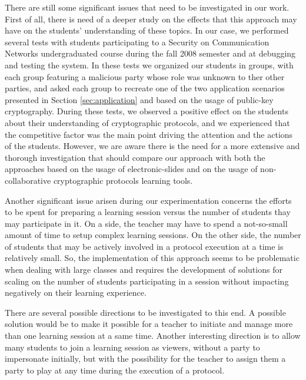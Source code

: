 \documentclass[conference]{IEEEtran}
\begin{document}
There are still some significant issues that need to be
investigated in our work. First of all, there is need of a deeper study on
the effects that this approach may have on
the students' understanding of these topics. In our case, we performed
several tests with students participating to a Security on
Communication Networks undergraduated course during the fall 2008
semester and at debugging and testing the system. In these tests we
organized our students in groups, with each group featuring a
malicious party whose role was unknown to ther other parties, and
asked each group to recreate one of the two application scenarios
presented in Section \ref{sec:application} and based on the usage of public-key cryptography.
During these tests, we observed a positive effect on the students
about their understanding of cryptographic protocols, and we
experienced that the competitive factor was the main point driving the
attention and the actions of the students. However, we are aware there is the need
for a more extensive and thorough investigation that should compare
our approach with both the approaches based on the usage of
electronic-slides and on the usage of non-collaborative cryptographic
protocols learning tools.

Another significant issue arisen during our experimentation concerns the efforts
to be spent for preparing a learning session versus the number of
students thay may participate in it. On a side, the teacher may have
to spend a not-so-small amount of time to setup complex learning
sessions. On the other side, the number of students that may be
actively involved in a protocol execution at a time is relatively
small. So, the implementation of this approach seems to be problematic when dealing
with large classes and requires the development of solutions for
scaling on the number of students participating in a session without
impacting negatively on their learning experience. 

There are several possible directions to be investigated to this
end. A possible solution would be to make it possible for a teacher to
initiate and manage more than one learning session at a same
time. Another interesting direction is to allow many students to join a learning
session as viewers, without a party to impersonate initially, but with
the possibility for the teacher to assign them a party to play at any
time during the execution of a protocol.

 

\end{document}
